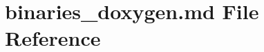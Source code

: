 \hypertarget{binaries__doxygen_8md}{\section{binaries\-\_\-doxygen.\-md File Reference}
\label{binaries__doxygen_8md}
}
